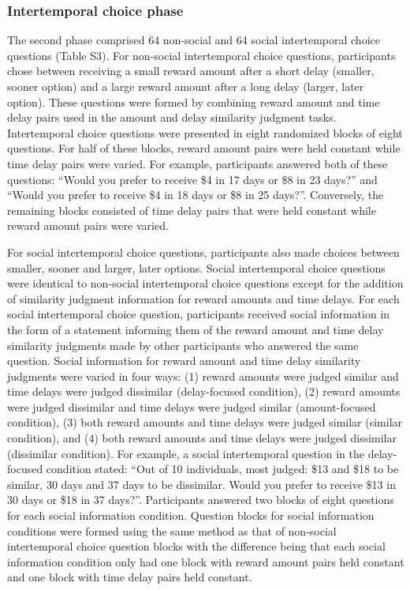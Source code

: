 \documentclass[
  pub,floatsintext]{apa6}
\begin{document}
\hypertarget{intertemporal-choice-phase}{%
\subsubsection{Intertemporal choice phase}\label{intertemporal-choice-phase}}

The second phase comprised 64 non-social and 64 social intertemporal choice questions (Table S3). For non-social intertemporal choice questions, participants chose between receiving a small reward amount after a short delay (smaller, sooner option) and a large reward amount after a long delay (larger, later option). These questions were formed by combining reward amount and time delay pairs used in the amount and delay similarity judgment tasks. Intertemporal choice questions were presented in eight randomized blocks of eight questions. For half of these blocks, reward amount pairs were held constant while time delay pairs were varied. For example, participants answered both of these questions: ``Would you prefer to receive \$4 in 17 days or \$8 in 23 days?'' and ``Would you prefer to receive \$4 in 18 days or \$8 in 25 days?''. Conversely, the remaining blocks consisted of time delay pairs that were held constant while reward amount pairs were varied.

For social intertemporal choice questions, participants also made choices between smaller, sooner and larger, later options. Social intertemporal choice questions were identical to non-social intertemporal choice questions except for the addition of similarity judgment information for reward amounts and time delays. For each social intertemporal choice question, participants received social information in the form of a statement informing them of the reward amount and time delay similarity judgments made by other participants who answered the same question. Social information for reward amount and time delay similarity judgments were varied in four ways: (1) reward amounts were judged similar and time delays were judged dissimilar (delay-focused condition), (2) reward amounts were judged dissimilar and time delays were judged similar (amount-focused condition), (3) both reward amounts and time delays were judged similar (similar condition), and (4) both reward amounts and time delays were judged dissimilar (dissimilar condition). For example, a social intertemporal question in the delay-focused condition stated: ``Out of 10 individuals, most judged: \$13 and \$18 to be similar, 30 days and 37 days to be dissimilar. Would you prefer to receive \$13 in 30 days or \$18 in 37 days?''. Participants answered two blocks of eight questions for each social information condition. Question blocks for social information conditions were formed using the same method as that of non-social intertemporal choice question blocks with the difference being that each social information condition only had one block with reward amount pairs held constant and one block with time delay pairs held constant.
\end{document}
